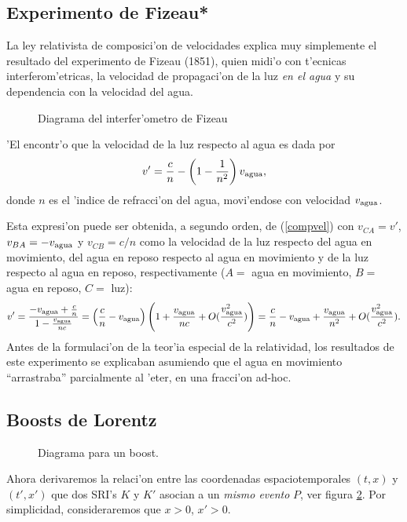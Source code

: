 \subsection{Experimento de Fizeau*}
La ley relativista de composici'on de velocidades explica muy simplemente el
resultado del experimento de Fizeau (1851), quien midi'o con t'ecnicas
interferom'etricas, la velocidad de propagaci'on de la luz \textit{en el agua}
y su dependencia con la velocidad del agua.
\begin{figure}[!h]
\centerline{}
 \caption{Diagrama del interfer'ometro de Fizeau}
\label{fizeau}
\end{figure}
'El encontr'o que la velocidad de la luz respecto al agua es dada por
\begin{equation}
v'=\frac{c}{n}-\left(1-\frac{1}{n^2}\right)v_{\rm agua} ,
\end{equation}
donde $n$ es el 'indice de refracci'on del agua, movi'endose con velocidad $v_{\rm agua}$.

Esta expresi'on puede ser obtenida, a segundo orden, de (\ref{compvel}) con
$v_{CA}=v'$, $v_{BA}=-v_{\rm agua}$ y $v_{CB}=c/n$ como la velocidad de la luz
respecto del agua en movimiento, del agua en reposo respecto al agua en
movimiento y de la luz respecto al agua en reposo, respectivamente ($A=$ agua
en movimiento, $B=$ agua en reposo, $C=$ luz):
\begin{equation}
v'=\frac{-v_{\rm agua}+\frac{c}{n}}{1-\frac{v_{\rm
agua}}{nc}}=\left(\frac{c}{n}-v_{\rm agua}\right)\left(1+\frac{v_{\rm
agua}}{nc}+O(\frac{v_{\rm agua}^2}{c^2})\right)=\frac{c}{n}-v_{\rm
agua}+\frac{v_{\rm agua}}{n^2}+O(\frac{v_{\rm
agua}^2}{c^2}).
\end{equation}
Antes de la formulaci'on de la teor'ia especial de la relatividad, los
resultados de este experimento se explicaban asumiendo que el agua en movimiento
``arrastraba'' parcialmente al 'eter, en una fracci'on ad-hoc.


\subsection{Boosts de Lorentz} \label{secboostx}
\begin{figure}[!h]
\centerline{}
 \caption{Diagrama para un boost.}
\label{boo}
\end{figure}
Ahora derivaremos la relaci'on entre las coordenadas espaciotemporales $(t,x)$
y $(t',x')$ que dos SRI's $K$ y $K'$ asocian a un \textit{mismo evento} $P$, ver figura \ref{boo}. Por simplicidad, consideraremos que $x>0$, $x'>0$.

